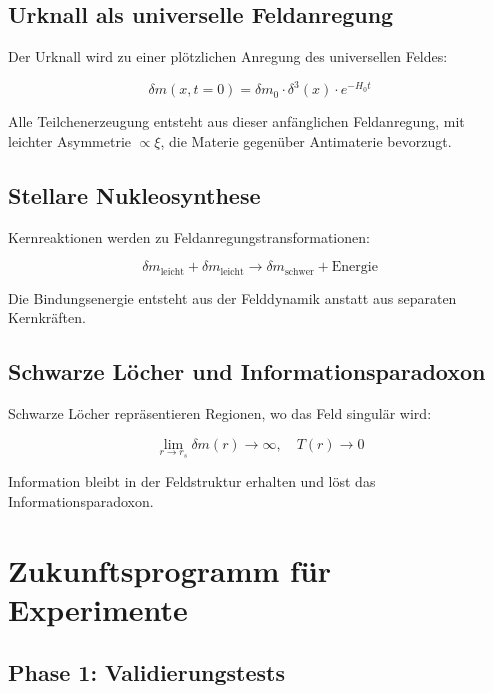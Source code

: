 \documentclass[12pt,a4paper]{article}
\newcommand{\deltam}{\delta m}
\newcommand{\xipar}{\xi}
\begin{document}
	\subsection{Urknall als universelle Feldanregung}
	
	Der Urknall wird zu einer plötzlichen Anregung des universellen Feldes:
	
	\begin{equation}
		\deltam(x,t=0) = \deltam_0 \cdot \delta^3(x) \cdot e^{-H_0 t}
		\label{eq:big_bang_field}
	\end{equation}
	
	Alle Teilchenerzeugung entsteht aus dieser anfänglichen Feldanregung, mit leichter Asymmetrie $\propto \xipar$, die Materie gegenüber Antimaterie bevorzugt.
	
	\subsection{Stellare Nukleosynthese}
	
	Kernreaktionen werden zu Feldanregungstransformationen:
	
	\begin{equation}
		\deltam_{\text{leicht}} + \deltam_{\text{leicht}} \rightarrow \deltam_{\text{schwer}} + \text{Energie}
		\label{eq:nucleosynthesis_field}
	\end{equation}
	
	Die Bindungsenergie entsteht aus der Felddynamik anstatt aus separaten Kernkräften.
	
	\subsection{Schwarze Löcher und Informationsparadoxon}
	
	Schwarze Löcher repräsentieren Regionen, wo das Feld singulär wird:
	
	\begin{equation}
		\lim_{r \to r_s} \deltam(r) \to \infty, \quad T(r) \to 0
		\label{eq:black_hole_singularity}
	\end{equation}
	
	Information bleibt in der Feldstruktur erhalten und löst das Informationsparadoxon.
	
	\section{Zukunftsprogramm für Experimente}
	
	\subsection{Phase 1: Validierungstests}
	
\end{document}
